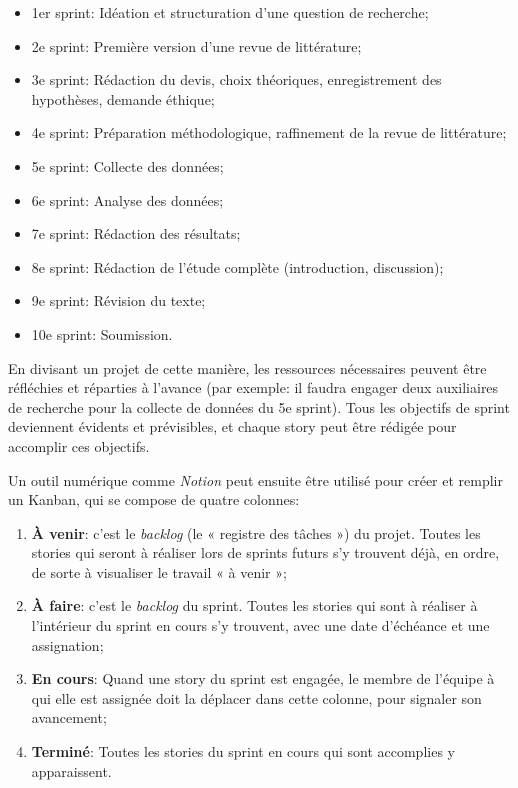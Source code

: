 \documentclass[
  letterpaper,
  DIV=11,
  numbers=noendperiod]{scrreprt}
\providecommand{\tightlist}{%
  \setlength{\itemsep}{0pt}\setlength{\parskip}{0pt}}\usepackage{longtable,booktabs,array}
\begin{document}
\begin{itemize}
\tightlist
\item
  1er sprint: Idéation et structuration d'une question de recherche;
\item
  2e sprint: Première version d'une revue de littérature;
\item
  3e sprint: Rédaction du devis, choix théoriques, enregistrement des
  hypothèses, demande éthique;
\item
  4e sprint: Préparation méthodologique, raffinement de la revue de
  littérature;
\item
  5e sprint: Collecte des données;
\item
  6e sprint: Analyse des données;
\item
  7e sprint: Rédaction des résultats;
\item
  8e sprint: Rédaction de l'étude complète (introduction, discussion);
\item
  9e sprint: Révision du texte;
\item
  10e sprint: Soumission.
\end{itemize}

En divisant un projet de cette manière, les ressources nécessaires
peuvent être réfléchies et réparties à l'avance (par exemple: il faudra
engager deux auxiliaires de recherche pour la collecte de données du 5e
sprint). Tous les objectifs de sprint deviennent évidents et
prévisibles, et chaque story peut être rédigée pour accomplir ces
objectifs.

Un outil numérique comme \emph{Notion} peut ensuite être utilisé pour
créer et remplir un Kanban, qui se compose de quatre colonnes:

\begin{enumerate}
\def\labelenumi{\arabic{enumi}.}
\tightlist
\item
  \textbf{À venir}: c'est le \emph{backlog} (le « registre des tâches »)
  du projet. Toutes les stories qui seront à réaliser lors de sprints
  futurs s'y trouvent déjà, en ordre, de sorte à visualiser le travail «
  à venir »;
\item
  \textbf{À faire}: c'est le \emph{backlog} du sprint. Toutes les
  stories qui sont à réaliser à l'intérieur du sprint en cours s'y
  trouvent, avec une date d'échéance et une assignation;
\item
  \textbf{En cours}: Quand une story du sprint est engagée, le membre de
  l'équipe à qui elle est assignée doit la déplacer dans cette colonne,
  pour signaler son avancement;
\item
  \textbf{Terminé}: Toutes les stories du sprint en cours qui sont
  accomplies y apparaissent.
\end{enumerate}
\end{document}
